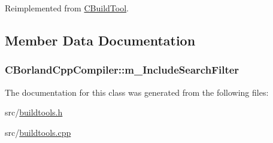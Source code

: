 Reimplemented from \hyperlink{classCBuildTool_ad07fcd46ccc841bc131d65505e5343c1}{C\-Build\-Tool}.



\subsection{Member Data Documentation}
\hypertarget{classCBorlandCppCompiler_a14852b7a3ed29696f0a187698a1c3b70}{
\subsubsection[{m\-\_\-\-Include\-Search\-Filter}]{ C\-Borland\-Cpp\-Compiler\-::m\-\_\-\-Include\-Search\-Filter\hspace{0.3cm}{\ttfamily [private]}}}\label{classCBorlandCppCompiler_a14852b7a3ed29696f0a187698a1c3b70}


The documentation for this class was generated from the following files\-:\begin{DoxyCompactItemize}
\item 
src/\hyperlink{buildtools_8h}{buildtools.\-h}\item 
src/\hyperlink{buildtools_8cpp}{buildtools.\-cpp}\end{DoxyCompactItemize}
